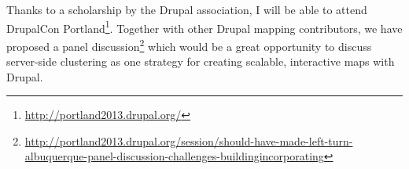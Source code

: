 Thanks to a scholarship by the Drupal association, I will be able to attend DrupalCon Portland\footnote{\url{http://portland2013.drupal.org/}}. Together with other Drupal mapping contributors, we have proposed a panel discussion\footnote{\url{http://portland2013.drupal.org/session/should-have-made-left-turn-albuquerque-panel-discussion-challenges-buildingincorporating}} which would be a great opportunity to discuss server-side clustering as one strategy for creating scalable, interactive maps with Drupal.

